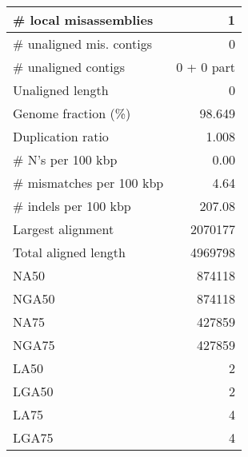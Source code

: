 \documentclass[12pt,a4paper]{article}
\begin{document}
\begin{table}[ht]
\begin{center}
\begin{tabular}{|l*{1}{|r}|}
\# local misassemblies & 1 \\ \hline
\# unaligned mis. contigs & 0 \\ \hline
\# unaligned contigs & 0 + 0 part \\ \hline
Unaligned length & 0 \\ \hline
Genome fraction (\%) & 98.649 \\ \hline
Duplication ratio & 1.008 \\ \hline
\# N's per 100 kbp & 0.00 \\ \hline
\# mismatches per 100 kbp & 4.64 \\ \hline
\# indels per 100 kbp & 207.08 \\ \hline
Largest alignment & 2070177 \\ \hline
Total aligned length & 4969798 \\ \hline
NA50 & 874118 \\ \hline
NGA50 & 874118 \\ \hline
NA75 & 427859 \\ \hline
NGA75 & 427859 \\ \hline
LA50 & 2 \\ \hline
LGA50 & 2 \\ \hline
LA75 & 4 \\ \hline
LGA75 & 4 \\ \hline
\end{tabular}
\end{center}
\end{table}
\end{document}
